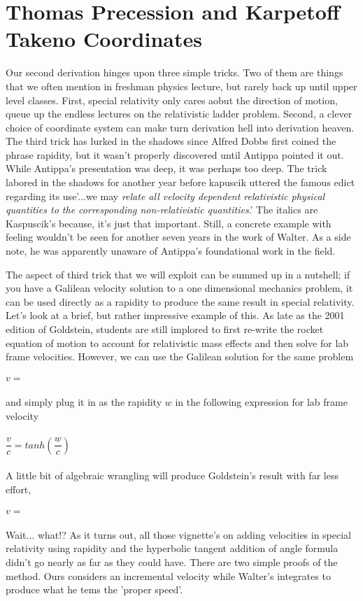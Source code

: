 \documentclass[prb,preprint]{revtex4-1}
\begin{document}
\section{Thomas Precession and Karpetoff Takeno Coordinates}
Our second derivation hinges upon three simple tricks. Two of them are things that we often mention in freshman physics lecture, but rarely back up until upper level classes.  First, special relativity only cares aobut the direction of motion, queue up the endless lectures on the relativistic ladder problem.  Second, a clever choice of coordinate system can make turn derivation hell into derivation heaven.  The third trick has lurked in the shadows since Alfred Dobbs first coined the phrase rapidity, but it wasn't properly discovered until Antippa \cite{antipparapid} pointed it out.  While Antippa's presentation was deep, it was perhaps too deep.  The trick labored in the shadows for another year before kapuscik\cite{kapuscikrapid} uttered the famous edict regarding its use'...we may \textit{relate all velocity dependent relativistic physical quantities to the corresponding non-relativistic quantities}.'  The italics are Kaspuscik's because, it's just that important.  Still, a concrete example with feeling wouldn't be seen for another seven years in the work of Walter\cite{wlaterrapid}.  As a side note, he was apparently unaware of Antippa's foundational work in the field.

The aspect of third trick that we will exploit can be summed up in a nutshell; if you have a Galilean velocity solution to a one dimensional mechanics problem, it can be used directly as a rapidity to produce the same result in special relativity.  Let's look at a brief, but rather impressive example of this.  As late as the 2001 edition of Goldstein, students are still implored to first re-write the rocket equation of motion to account for relativistic mass effects and then solve for lab frame velocities.  However, we can use the Galilean solution for the same problem
\\
\\
$v = $
\\
\\
and simply plug it in as the rapidity $w$ in the following expression for lab frame velocity
\\
\\
$\dfrac{v}{c} = tanh\left(\dfrac{w}{c}\right)$
\\
\\
A little bit of algebraic wrangling will produce Goldstein's result with far less effort,
\\
\\
$v = $
\\
\\
Wait... what!?  As it turns out, all those vignette's on adding velocities in special relativity using rapidity and the hyperbolic tangent addition of angle formula didn't go nearly as far as they could have.  There are two simple proofs of the method.  Ours considers an incremental velocity while Walter's integrates to produce what he tems the 'proper speed'.
\end{document}
